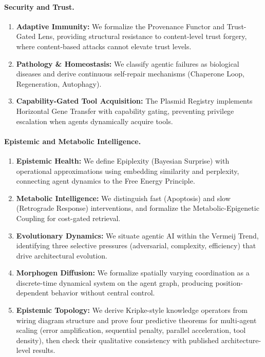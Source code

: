\paragraph{Security and Trust.}
\begin{enumerate}[leftmargin=*,resume]
\item \textbf{Adaptive Immunity:} We formalize the Provenance Functor and Trust-Gated Lens, providing
structural resistance to content-level trust forgery, where content-based attacks cannot elevate trust levels.
\item \textbf{Pathology \& Homeostasis:} We classify agentic failures as biological diseases and derive
continuous self-repair mechanisms (Chaperone Loop, Regeneration, Autophagy).
\item \textbf{Capability-Gated Tool Acquisition:} The Plasmid Registry implements Horizontal Gene
Transfer with capability gating, preventing privilege escalation when agents dynamically acquire tools.
\end{enumerate}

\paragraph{Epistemic and Metabolic Intelligence.}
\begin{enumerate}[leftmargin=*,resume]
\item \textbf{Epistemic Health:} We define Epiplexity (Bayesian Surprise) with operational approximations
using embedding similarity and perplexity, connecting agent dynamics to the Free Energy Principle.
\item \textbf{Metabolic Intelligence:} We distinguish fast (Apoptosis) and slow (Retrograde Response)
interventions, and formalize the Metabolic-Epigenetic Coupling for cost-gated retrieval.
\item \textbf{Evolutionary Dynamics:} We situate agentic AI within the Vermeij Trend, identifying three
selective pressures (adversarial, complexity, efficiency) that drive architectural evolution.
\item \textbf{Morphogen Diffusion:} We formalize spatially varying coordination as a discrete-time
dynamical system on the agent graph, producing position-dependent behavior without central control.
\item \textbf{Epistemic Topology:} We derive Kripke-style knowledge operators from wiring diagram
structure and prove four predictive theorems for multi-agent scaling (error amplification, sequential
penalty, parallel acceleration, tool density), then check their qualitative consistency with published architecture-level results.
\end{enumerate}

